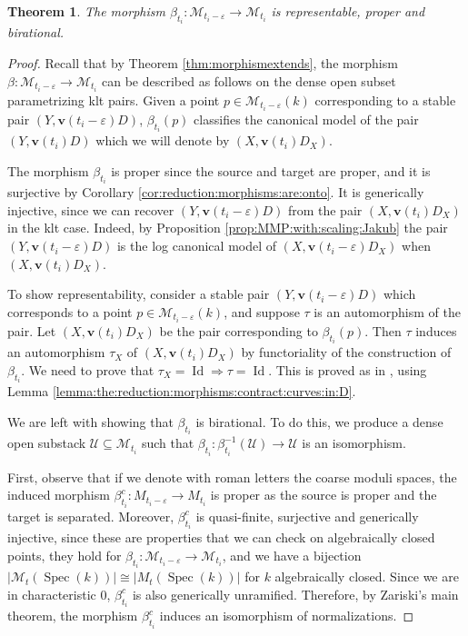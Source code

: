 \documentclass[11pt]{amsart}
\newtheorem{theorem}{Theorem}[section]
\theoremstyle{definition}
\theoremstyle{remark}
\newcommand{\calU}{\mathcal U}
\newcommand{\sM}{\mathscr{M}}
\newcommand{\Spec}{\operatorname{Spec}}
\newcommand{\bfv}{\mathbf{v}}
\begin{document}
	\begin{theorem}\label{thm:reduction:morphism:birational:for:ZMT}
		The morphism $\beta_{t_i} : \sM_{t_i - \varepsilon} \to \sM_{t_i}$ is representable, proper and birational.
	\end{theorem}
	\begin{proof}
		Recall that by Theorem \ref{thm:morphismextends},  the morphism $\beta : \sM_{t_i-\varepsilon} \to \sM_{t_i}$ can be described as follows on the dense open subset parametrizing klt pairs. Given a point $p \in \sM_{t_i-\varepsilon}(k)$ corresponding to a stable pair $(Y, \bfv(t_i -\varepsilon)D)$, $\beta_{t_i}(p)$ classifies the canonical model of the pair $(Y, \bfv(t_i)D)$ which we will denote by $(X, \bfv(t_i)D_X)$. 
		
		The morphism $\beta_{t_i}$ is proper since the source and target are proper, and it is surjective by Corollary \ref{cor:reduction:morphisms:are:onto}. It is generically injective, since we can recover
		$(Y,\mathbf{v}(t_i-\varepsilon)D)$ from the pair $(X,\mathbf{v}(t_i)D_X)$ in the klt case. Indeed, by Proposition \ref{prop:MMP:with:scaling:Jakub} the pair $(Y,\mathbf{v}(t_i-\varepsilon)D)$ is the log canonical  model of $(X,\mathbf{v}(t_i-\varepsilon)D_X)$ when $(X, \mathbf{v}(t_i)D_X)$.
		
		To show representability, consider a stable pair $(Y,\mathbf{v}(t_i-\varepsilon)D)$ which corresponds to a point $p \in \sM_{t_i-\varepsilon}(k)$, and suppose
		$\tau$ is an automorphism of the pair. Let $(X,\mathbf{v}(t_i)D_X)$ be the pair corresponding to $\beta_{t_i}(p)$. Then $\tau$ induces an automorphism $\tau_X$ of $(X,\mathbf{v}(t_i)D_X)$ by functoriality of the construction of $\beta_{t_i}$. We need to prove that $\tau_X=\operatorname{Id} \Longrightarrow \tau=\operatorname{Id}$. This is proved as in \cite[Observation 8.4]{Inc18}, using Lemma \ref{lemma:the:reduction:morphisms:contract:curves:in:D}.
		
		We are left with showing that $\beta_{t_i}$ is birational. To do this, we produce a dense open substack $\calU \subseteq \sM_{t_i}$ such that 
		$
		\beta_{t_i} : \beta_{t_i}^{-1}(\calU) \to \calU
		$
		is an isomorphism. 
		
		
		First, observe that if we denote with roman letters the coarse moduli spaces, the induced morphism $\beta_{t_i}^c:M_{t_i-\varepsilon} \to M_{t_i}$ is proper as the source is proper and the target is separated. Moreover, $\beta_{t_i}^c$ is quasi-finite, surjective and generically injective, since these are properties
		that we can check on algebraically closed points, they hold for $\beta_{t_i}:\sM_{t_i-\varepsilon} \to \sM_{t_i}$, and we have a bijection $|\sM_t(\Spec(k))| \cong |M_t(\Spec(k))|$ for $k$ algebraically closed. Since we are in characteristic $0$, $\beta_{t_i}^c$ is also generically unramified. Therefore, by Zariski's main theorem, the morphism $\beta_{t_i}^c$ induces an isomorphism of normalizations.
		

\end{proof}
\end{document}

